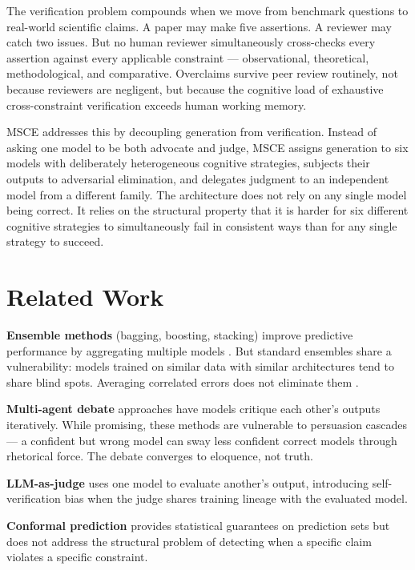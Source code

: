 \documentclass[11pt,a4paper]{article}
\begin{document}
The verification problem compounds when we move from benchmark questions to real-world scientific claims. A paper may make five assertions. A reviewer may catch two issues. But no human reviewer simultaneously cross-checks every assertion against every applicable constraint — observational, theoretical, methodological, and comparative. Overclaims survive peer review routinely, not because reviewers are negligent, but because the cognitive load of exhaustive cross-constraint verification exceeds human working memory.

MSCE addresses this by decoupling generation from verification. Instead of asking one model to be both advocate and judge, MSCE assigns generation to six models with deliberately heterogeneous cognitive strategies, subjects their outputs to adversarial elimination, and delegates judgment to an independent model from a different family. The architecture does not rely on any single model being correct. It relies on the structural property that it is harder for six different cognitive strategies to simultaneously fail in consistent ways than for any single strategy to succeed.

\section{Related Work}

\textbf{Ensemble methods} (bagging, boosting, stacking) improve predictive performance by aggregating multiple models \cite{dietterich2000}. But standard ensembles share a vulnerability: models trained on similar data with similar architectures tend to share blind spots. Averaging correlated errors does not eliminate them \cite{breiman2001}.

\textbf{Multi-agent debate} approaches \cite{du2024, michael2024} have models critique each other's outputs iteratively. While promising, these methods are vulnerable to persuasion cascades — a confident but wrong model can sway less confident correct models through rhetorical force. The debate converges to eloquence, not truth.

\textbf{LLM-as-judge} \cite{zheng2023} uses one model to evaluate another's output, introducing self-verification bias when the judge shares training lineage with the evaluated model.

\textbf{Conformal prediction} \cite{angelopoulos2023} provides statistical guarantees on prediction sets but does not address the structural problem of detecting when a specific claim violates a specific constraint.
\end{document}
